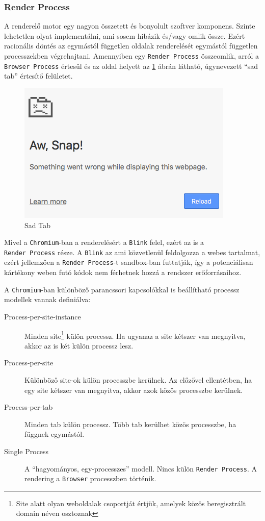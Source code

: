 \documentclass[12pt]{report}
\begin{document}
\subsubsection{Render Process}
A renderelő motor egy nagyon összetett és bonyolult szoftver komponens. Szinte lehetetlen
olyat implementálni, ami sosem hibázik és/vagy omlik össze. \cite{bib-chromium-multi-process}
Ezért racionális döntés az egymástól független oldalak renderelését egymástól független
processzekben végrehajtani. Amennyiben egy \texttt{Render Process} összeomlik, arról a
\texttt{Browser Process} értesül és az oldal helyett az \ref{fig-sad-tab} ábrán látható,
úgynevezett ``sad tab'' értesítő felületet.

\begin{figure}[h]
    \centering
    \includegraphics[scale=0.8]{sad_tab}
    \caption{
        \label{fig-sad-tab}
        Sad Tab
    }
\end{figure}

Mivel a \texttt{Chromium}-ban a renderelésért a \texttt{Blink} felel, ezért az is a \\
\texttt{Render Process} része. A \texttt{Blink} az ami közvetlenül feldolgozza a webes
tartalmat, ezért jellemzően a \texttt{Render Process}-t sandbox-ban futtatják, így a
potenciálisan kártékony weben futó kódok nem férhetnek hozzá a rendszer erőforrásaihoz.

A \texttt{Chromium}-ban különböző parancssori kapcsolókkal is beállítható processz modellek
vannak definiálva:
\begin{description}
    \item[Process-per-site-instance]
        Minden site\footnote{Site alatt olyan weboldalak csoportját értjük, amelyek
        közös beregisztrált domain néven osztoznak} külön processz.
        Ha ugyanaz a site kétszer van megnyitva, akkor az is két külön processz lesz.
    \item[Process-per-site]
        Különböző site-ok külön processzbe kerülnek. Az előzővel ellentétben, ha egy site
        kétszer van megnyitva, akkor azok közös processzbe kerülnek.
    \item[Process-per-tab]
        Minden tab külön processz. Több tab kerülhet közös processzbe, ha függnek egymástól.
    \item[Single Process]
        A ``hagyományos, egy-processzes'' modell. Nincs külön \texttt{Render Process}.
        A rendering a \texttt{Browser} processzben történik.
\end{description}
\end{document}
